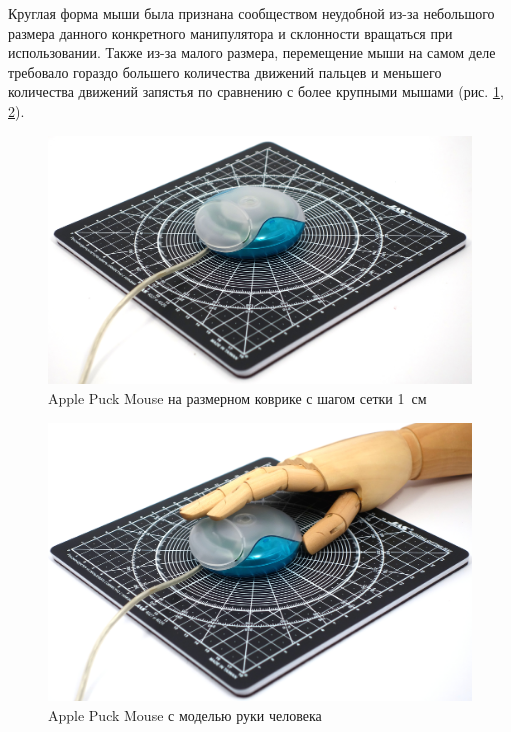 \documentclass[11pt, a4paper]{article}
\begin{document}
Круглая форма мыши была признана сообществом неудобной из-за небольшого размера данного конкретного манипулятора и склонности вращаться при использовании.
Также из-за малого размера, перемещение мыши на самом деле требовало гораздо большего количества движений  пальцев и  меньшего количества движений запястья по сравнению с более крупными мышами (рис. \ref{fig:size}, \ref{fig:hand}).

\begin{figure}[h]
    \centering
    \includegraphics[scale=0.4]{1998_apple_puck/appleset60.jpg}
    \caption{Apple Puck Mouse на размерном коврике с шагом сетки 1~см}
    \label{fig:size}
\end{figure}

\begin{figure}[h]
    \centering
    \includegraphics[scale=0.4]{1998_apple_puck/appleset62.jpg}
    \caption{Apple Puck Mouse с моделью руки человека}
    \label{fig:hand}
\end{figure}
\end{document}
